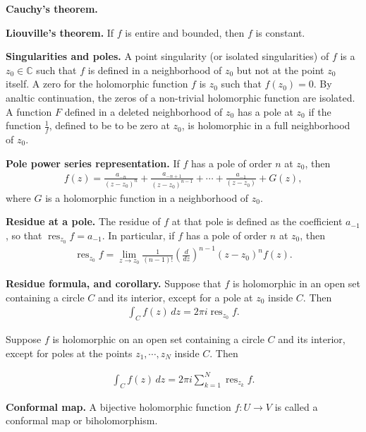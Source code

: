 \documentclass[12pt]{article}
\newcommand{\CC}{\mathbb{C}}
\DeclareMathOperator{\res}{res}
\def\CC{\mathbb{C}}
\begin{document}
        {\bf Cauchy's theorem.}

        {\bf Liouville's theorem.} If $f$ is entire and bounded, then $f$ is constant.

        {\bf Singularities and poles.} A point singularity (or isolated singularities) of $f$ is a $z_0 \in \CC$ such that $f$ is defined in a neighborhood of $z_0$ but not at the point $z_0$ itself.  A zero for the holomorphic function $f$ is $z_0$ such that $f(z_0) = 0$.  By analtic continuation, the zeros of a non-trivial holomorphic function are isolated.  A function $F$ defined in a deleted neighborhood of $z_0$ has a pole at $z_0$ if the function $\frac{1}{f}$, defined to be to be zero at $z_0$, is holomorphic in a full neighborhood of $z_0$.

        {\bf Pole power series representation.}  If $f$ has a pole of order $n$ at $z_0$, then
        \begin{align*}
          f(z) = \frac{a_{-n}}{(z-z_0)^n} + \frac{a_{-n+1}}{(z - z_0)^{n-1}} + \cdots + \frac{a_{-1}}{(z - z_0)} + G(z),
        \end{align*}
        where $G$ is a holomorphic function in a neighborhood of $z_0$.

        {\bf Residue at a pole.}  The residue of $f$ at that pole is defined as the coefficient $a_{-1}$, so that $\res_{z_0} f = a_{-1}$.  In particular, if $f$ has a pole of order $n$ at $z_0$, then
        \begin{align*}
          \res_{z_0} f = \lim_{z \to z_0} \frac{1}{(n-1)!} \left( \frac{d}{dz} \right)^{n-1} (z - z_0)^n f(z).
        \end{align*}

        {\bf Residue formula, and corollary.} Suppose that $f$ is holomorphic in an open set containing a circle $C$ and its interior, except for a pole at $z_0$ inside $C$.  Then
        \begin{align*}
          \int_{C} f(z) \, dz = 2 \pi i \res_{z_0} f.
        \end{align*}

        Suppose $f$ is holomorphic on an open set containing a circle $C$ and its interior, except for poles at the points $z_1, \cdots, z_N$ inside $C$.  Then

        \begin{align*}
          \int_{C} f(z) \, dz = 2 \pi i \sum_{k=1}^{N} \res_{z_k} f.
        \end{align*}
 
        {\bf Conformal map.} A bijective holomorphic function $f: U \to V$ is called a conformal map or biholomorphism.
\end{document}
